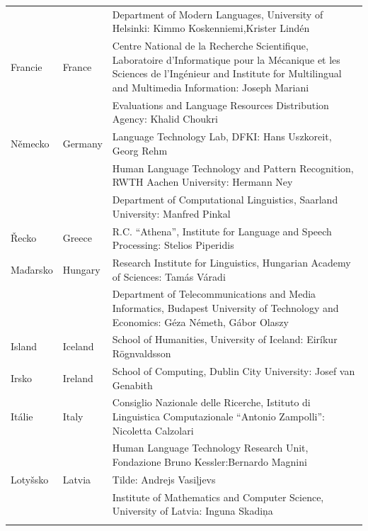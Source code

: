 \begin{longtable}{@{}llp{113mm}@{}}
  & & Department of Modern Languages, University of Helsinki: Kimmo Koskenniemi,\newline Krister Lindén \\ \addlinespace
  Francie & \textcolor{grey1}{France} & Centre National de la Recherche Scientifique, Laboratoire d'Informatique pour la Mécanique et les Sciences de l'Ingénieur and Institute for Multilingual and Multimedia Information: Joseph Mariani \\ \addlinespace
  & & Evaluations and Language Resources Distribution Agency: Khalid Choukri\\ \addlinespace
  Německo & \textcolor{grey1}{Germany} & Language Technology Lab, DFKI: Hans Uszkoreit, Georg Rehm\\ \addlinespace
  & & Human Language Technology and Pattern Recognition, RWTH Aachen University: Hermann Ney \\ \addlinespace
  & & Department of Computational Linguistics, Saarland University: Manfred Pinkal\\ \addlinespace 
  Řecko & \textcolor{grey1}{Greece} & R.C. “Athena”, Institute for Language and Speech Processing: Stelios Piperidis\\ \addlinespace
  Maďarsko & \textcolor{grey1}{Hungary} & Research Institute for Linguistics, Hungarian Academy of Sciences: Tamás Váradi\\  \addlinespace
  & & Department of Telecommunications and Media Informatics, Budapest University of Technology and Economics: Géza Németh, Gábor Olaszy\\ \addlinespace
  Island & \textcolor{grey1}{Iceland} & School of Humanities, University of Iceland: Eiríkur Rögnvaldsson\\ \addlinespace
  Irsko & \textcolor{grey1}{Ireland} & School of Computing, Dublin City University: Josef van Genabith\\ \addlinespace
  Itálie & \textcolor{grey1}{Italy} & Consiglio Nazionale delle Ricerche, Istituto di Linguistica Computazionale “Antonio Zampolli”: Nicoletta Calzolari\\ \addlinespace
  & & Human Language Technology Research Unit, Fondazione Bruno Kessler:\newline Bernardo Magnini\\ \addlinespace
  Lotyšsko & \textcolor{grey1}{Latvia} & Tilde: Andrejs Vasiļjevs\\ \addlinespace 
  & & Institute of Mathematics and Computer Science, University of Latvia: Inguna Skadiņa\\ \addlinespace

\end{longtable}
